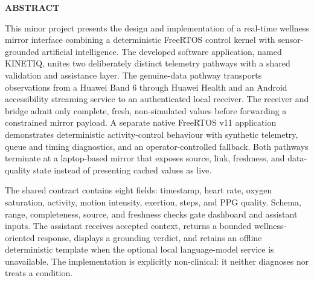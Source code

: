 \documentclass[12pt,a4paper,oneside]{report}
\begin{document}
\clearpage
\addtolength{\topmargin}{-3pt}
\addtolength{\footskip}{3pt}
\thispagestyle{plain}
{\setlength{\parskip}{0pt}
\vspace*{-12.1pt}
\begin{center}
{\bfseries\Large ABSTRACT}\par
\end{center}
\vspace{27.7pt}

This minor project presents the design and implementation of a real-time wellness mirror interface combining a deterministic FreeRTOS control kernel with sensor-grounded artificial intelligence. The developed software application, named KINETIQ, unites two deliberately distinct telemetry pathways with a shared validation and assistance layer. The genuine-data pathway transports observations from a Huawei Band 6 through Huawei Health and an Android accessibility streaming service to an authenticated local receiver. The receiver and bridge admit only complete, fresh, non-simulated values before forwarding a constrained mirror payload. A separate native FreeRTOS v11 application demonstrates deterministic activity-control behaviour with synthetic telemetry, queue and timing diagnostics, and an operator-controlled fallback. Both pathways terminate at a laptop-based mirror that exposes source, link, freshness, and data-quality state instead of presenting cached values as live.

The shared contract contains eight fields: timestamp, heart rate, oxygen saturation, activity, motion intensity, exertion, steps, and PPG quality. Schema, range, completeness, source, and freshness checks gate dashboard and assistant inputs. The assistant receives accepted context, returns a bounded wellness-oriented response, displays a grounding verdict, and retains an offline deterministic template when the optional local language-model service is unavailable. The implementation is explicitly non-clinical: it neither diagnoses nor treats a condition.

}
\end{document}
